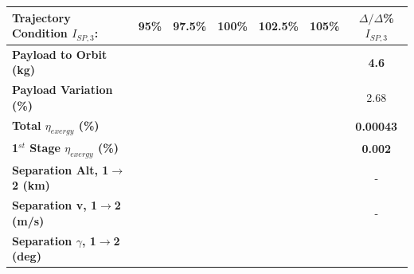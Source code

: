 \begin{table}[ht]
	\centering
	\begin{tabular}{l c c c c c c} 
		\hline \textbf{Trajectory Condition}   \qquad  $I_{SP,3}$:
		&95\%
		&97.5\%
		&100\%
		&102.5\%
		&105\%
		& $\Delta/\Delta$\%$I_{SP,3}$
		\\
		\hline \textbf{Payload to Orbit (kg)}
		& \textbf{\PayloadToOrbitISPThreeNinety}
		& \textbf{\PayloadToOrbitISPThreeNinetyFive}
		& \textbf{\PayloadToOrbitISPThreeStandard}
		& \textbf{\PayloadToOrbitISPThreeOneHundredFive}
		& \textbf{\PayloadToOrbitISPThreeOneHundredTen}
		&\textbf{4.6}
		\\
		\textbf{Payload Variation (\%)}
		& \PayloadVarISPThreeNinety
		& \PayloadVarISPThreeNinetyFive
		& \PayloadVarISPThreeStandard
		& \PayloadVarISPThreeOneHundredFive
		& \PayloadVarISPThreeOneHundredTen
		&2.68
		\\
		\textbf{Total $\eta_{exergy}$ (\%)}
		& \textbf{\totalExergyEffISPThreeNinety}
		& \textbf{\totalExergyEffISPThreeNinetyFive}
		& \textbf{\totalExergyEffISPThreeStandard}
		& \textbf{\totalExergyEffISPThreeOneHundredFive}
		& \textbf{\totalExergyEffISPThreeOneHundredTen}
		& \textbf{0.00043}
		\\
		\hline 
		\textbf{1$^{st}$ Stage $\eta_{exergy}$ (\%)}
		& \textbf{\firstExergyEffISPThreeNinety}
		& \textbf{\firstExergyEffISPThreeNinetyFive}
		& \textbf{\firstExergyEffISPThreeStandard}
		& \textbf{\firstExergyEffISPThreeOneHundredFive}
		& \textbf{\firstExergyEffISPThreeOneHundredTen}
		& \textbf{0.002}
		\\
		\textbf{Separation Alt, 1$\rightarrow$2 (km)}
		& \firstsecondSeparationAltISPThreeNinety
		& \firstsecondSeparationAltISPThreeNinetyFive
		& \firstsecondSeparationAltISPThreeStandard
		& \firstsecondSeparationAltISPThreeOneHundredFive
		& \firstsecondSeparationAltISPThreeOneHundredTen
		& -
		\\
		\textbf{Separation v, 1$\rightarrow$2 (m/s)}
		& \firstsecondSeparationvISPThreeNinety
		& \firstsecondSeparationvISPThreeNinetyFive
		& \firstsecondSeparationvISPThreeStandard
		& \firstsecondSeparationvISPThreeOneHundredFive
		& \firstsecondSeparationvISPThreeOneHundredTen
		& -
		\\
		\textbf{Separation $\gamma$, 1$\rightarrow$2 (deg)}
		& \firstsecondSeparationgammaISPThreeNinety
		& \firstsecondSeparationgammaISPThreeNinetyFive
		& \firstsecondSeparationgammaISPThreeStandard
		& \firstsecondSeparationgammaISPThreeOneHundredFive

\end{tabular}
\end{table}

